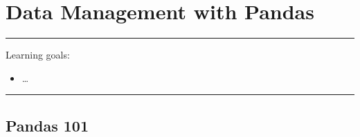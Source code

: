 \documentclass[a4paper,11pt]{book}
\numberwithin{figure}{chapter}
\numberwithin{table}{chapter}
\begin{document}
\theendnotes

\chapter{Data Management with Pandas}

\par\noindent\rule{\textwidth}{0.4pt}

Learning goals:

\begin{itemize}
	\item \dots
\end{itemize}

\par\noindent\rule{\textwidth}{0.4pt}

\section{Pandas 101}
\end{document}
